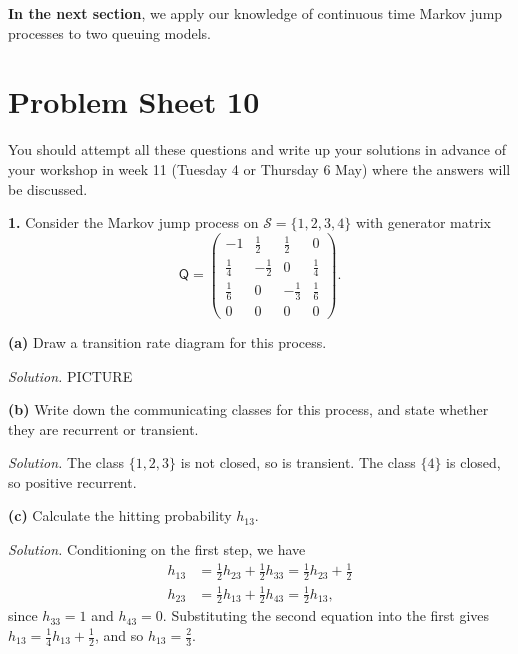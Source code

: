 \documentclass[
  a4paper,
]{article}
\newif\ifcomm\commtrue
\theoremstyle{definition}
\theoremstyle{definition}
\theoremstyle{definition}
\theoremstyle{remark}
\begin{document}
\textbf{In the next section}, we apply our knowledge of continuous time Markov jump processes to two queuing models.

\hypertarget{P10}{%
\section*{Problem Sheet 10}\label{P10}}

\commfalse

You should attempt all these questions and write up your solutions in advance of your workshop in week 11 (Tuesday 4 or Thursday 6 May) where the answers will be discussed.

\textbf{1.} Consider the Markov jump process on \(\mathcal S = \{1,2,3,4\}\) with generator matrix
\[ \mathsf Q = \begin{pmatrix} -1 & \frac12 & \frac12 & 0 \\
                               \frac14 & -\frac12 & 0 & \frac14 \\  
                               \frac16 & 0 & -\frac13 & \frac16 \\
                               0 & 0 & 0 & 0  \end{pmatrix} . \]

\textbf{(a)} Draw a transition rate diagram for this process.

\begin{myanswers}
\emph{Solution.}
PICTURE

\end{myanswers}

\textbf{(b)} Write down the communicating classes for this process, and state whether they are recurrent or transient.

\begin{myanswers}
\emph{Solution.}
The class \(\{1,2,3\}\) is not closed, so is transient. The class \(\{4\}\) is closed, so positive recurrent.

\end{myanswers}

\textbf{(c)} Calculate the hitting probability \(h_{13}\).

\begin{myanswers}
\emph{Solution.}
Conditioning on the first step, we have
\begin{align*}
h_{13} &= \tfrac12 h_{23} + \tfrac12 h_{33} = \tfrac12 h_{23} + \tfrac12 \\
h_{23} &= \tfrac12 h_{13} + \tfrac12 h_{43} = \tfrac12 h_{13} ,
\end{align*}
since \(h_{33} = 1\) and \(h_{43} = 0\).
Substituting the second equation into the first gives
\(h_{13} = \tfrac14 h_{13} + \tfrac12\), and so \(h_{13} = \frac23\).

\end{myanswers}
\end{document}
